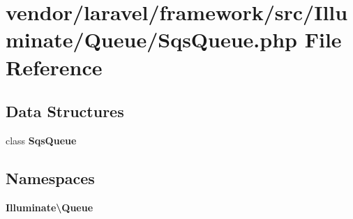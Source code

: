 \section{vendor/laravel/framework/src/\+Illuminate/\+Queue/\+Sqs\+Queue.php File Reference}
\label{_sqs_queue_8php}
\subsection*{Data Structures}
\begin{DoxyCompactItemize}
\item 
class {\bf Sqs\+Queue}
\end{DoxyCompactItemize}
\subsection*{Namespaces}
\begin{DoxyCompactItemize}
\item 
 {\bf Illuminate\textbackslash{}\+Queue}
\end{DoxyCompactItemize}
